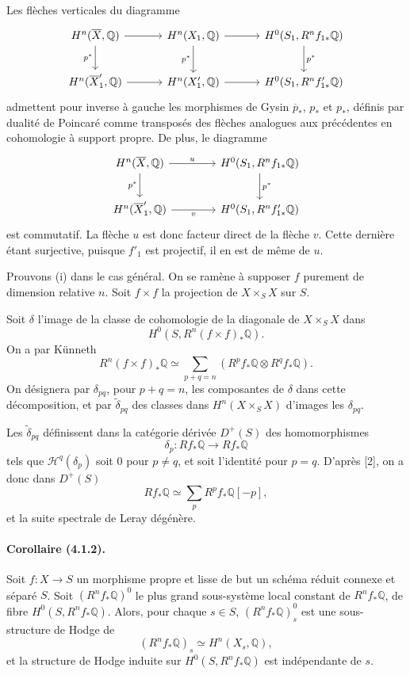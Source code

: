 \documentclass[10pt]{article}
\newcommand{\Q}{\mathbb Q}
\begin{document}
Les flèches verticales du diagramme
\[
\begin{tikzcd}[column sep=3.2em,row sep=2.2em]
H^n(\overline X,\Q) \arrow[r] \arrow[d,"p^*"'] &
H^n(X_1,\Q) \arrow[r] \arrow[d,"p^*"'] &
H^0(S_1,R^nf_{1*}\Q) \arrow[d,"p^*"]\\
H^n(\overline X'_1,\Q) \arrow[r] &
H^n(X'_1,\Q) \arrow[r] &
H^0(S_1,R^nf'_{1*}\Q)
\end{tikzcd}
\]
admettent pour inverse à gauche les morphismes de Gysin $\overline p_*$, $p_*$ et $p_*$, définis par dualité de Poincaré comme transposés des flèches analogues aux précédentes en cohomologie à support propre. De plus, le diagramme
\[
\begin{tikzcd}[column sep=4em,row sep=2.2em]
H^n(\overline X,\Q) \arrow[r,"u"] \arrow[d,"p^*"'] &
H^0(S_1,R^nf_{1*}\Q) \arrow[d,"p^*"]\\
H^n(\overline X'_1,\Q) \arrow[r,"v"'] &
H^0(S_1,R^nf'_{1*}\Q)
\end{tikzcd}
\]
est commutatif. La flèche $u$ est donc facteur direct de la flèche $v$. Cette dernière étant surjective, puisque $f'_1$ est projectif, il en est de même de $u$.

Prouvons (i) dans le cas général. On se ramène à supposer $f$ purement de dimension relative $n$. Soit $f\times f$ la projection de $X\times_SX$ sur $S$.

Soit $\delta$ l'image de la classe de cohomologie de la diagonale de $X\times_SX$ dans
\[
H^0(S,R^n(f\times f)_*\Q).
\]
On a par Künneth
\[
R^n(f\times f)_*\Q\simeq
\sum_{p+q=n}(R^pf_*\Q\otimes R^qf_*\Q).
\]
On désignera par $\delta_{pq}$, pour $p+q=n$, les composantes de $\delta$ dans cette décomposition, et par $\widetilde\delta_{pq}$ des classes dans $H^n(X\times_SX)$ d'images les $\delta_{pq}$.

Les $\widetilde\delta_{pq}$ définissent dans la catégorie dérivée $D^+(S)$ des homomorphismes
\[
\delta_p:Rf_*\Q\longrightarrow Rf_*\Q
\]
tels que $\mathcal H^q(\delta_p)$ soit $0$ pour $p\ne q$, et soit l'identité pour $p=q$. D'après [2], on a donc dans $D^+(S)$
\[
\tag{4.1.1.1}
Rf_*\Q\simeq\sum_p R^pf_*\Q[-p],
\]
et la suite spectrale de Leray dégénère.

\paragraph{Corollaire (4.1.2).} Soit $f:X\to S$ un morphisme propre et lisse de but un schéma réduit connexe et séparé $S$. Soit $(R^nf_*\Q)^0$ le plus grand sous-système local constant de $R^nf_*\Q$, de fibre $H^0(S,R^nf_*\Q)$. Alors, pour chaque $s\in S$, $(R^nf_*\Q)^0_s$ est une sous-structure de Hodge de
\[
(R^nf_*\Q)_s\simeq H^n(X_s,\Q),
\]
et la structure de Hodge induite sur $H^0(S,R^nf_*\Q)$ est indépendante de $s$.
\end{document}
